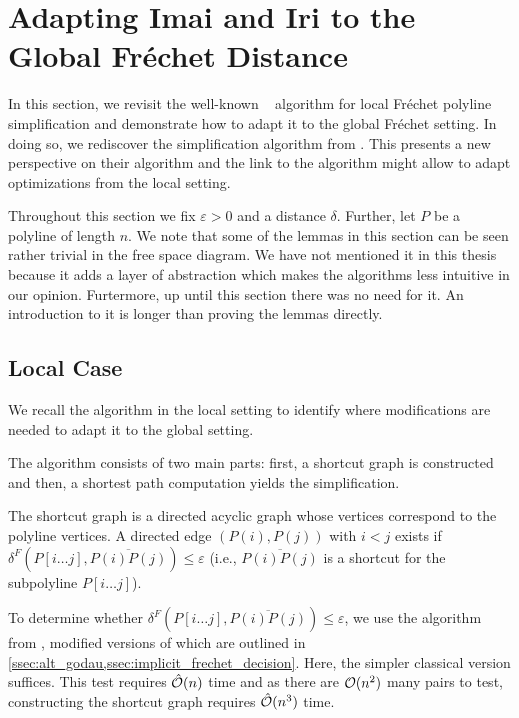 \section{Adapting Imai and Iri to the Global Fréchet Distance}
\label{sec:global_imai_iri}

In this section, we revisit the well-known \citeauthor{computational_geometric_methods_for_polygonal_approximations_of_a_curve}~\cite{computational_geometric_methods_for_polygonal_approximations_of_a_curve} algorithm for local Fréchet polyline simplification and demonstrate how to adapt it to the global Fréchet setting. In doing so, we rediscover the simplification algorithm from \citeauthor{global_curve_simplification}. This presents a new perspective on their algorithm and the link to the \citeauthor{computational_geometric_methods_for_polygonal_approximations_of_a_curve} algorithm might allow to adapt optimizations from the local setting.

Throughout this section we fix \(\varepsilon > 0\) and a distance \(\delta\). Further, let \(P\) be a polyline of length \(n\). We note that some of the lemmas in this section can be seen rather trivial in the free space diagram. We have not mentioned it in this thesis because it adds a layer of abstraction which makes the algorithms less intuitive in our opinion. Furtermore, up until this section there was no need for it. An introduction to it is longer than proving the lemmas directly.

\subsection{Local Case}

We recall the algorithm in the local setting to identify where modifications are needed to adapt it to the global setting. 

The algorithm consists of two main parts: first, a shortcut graph is constructed and then, a shortest path computation yields the simplification.

The shortcut graph is a directed acyclic graph whose vertices correspond to the polyline vertices. A directed edge \((P(i), P(j))\) with \(i < j\) exists if \(\delta^F(P[i \dots j], \overline{P(i)P(j)}) \leq \varepsilon\) (i.e., \(\overline{P(i)P(j)}\) is a shortcut for the subpolyline \(P[i \dots j]\)). 

To determine whether \(\delta^F(P[i \dots j], \overline{P(i)P(j)}) \leq \varepsilon\), we use the algorithm from \citeauthor{computing_the_frechet_distance_between_two_polygonal_curves}, modified versions of which are outlined in \cref{ssec:alt_godau,ssec:implicit_frechet_decision}. Here, the simpler classical version suffices. This test requires \(\hat{\mathcal{O}}(n)\) time and as there are \(\mathcal{O}(n^2)\) many pairs to test, constructing the shortcut graph requires \(\hat{\mathcal{O}}(n^3)\) time.

